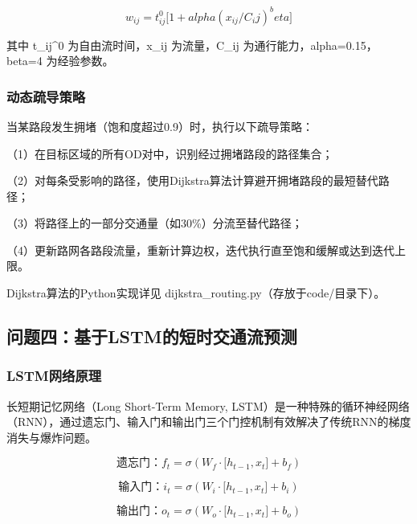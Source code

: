 \begin{equation}
  w_{ij} = t_{ij}^0 \lbrack 1 + alpha(x_{ij}/C_{i}j)^beta\rbrack 
  \label{eq:5}
\end{equation}

其中 t\_ij\textasciicircum{}0 为自由流时间，x\_ij 为流量，C\_ij 为通行能力，alpha=0.15，beta=4 为经验参数。

\subsubsection{动态疏导策略}

当某路段发生拥堵（饱和度超过0.9）时，执行以下疏导策略：

（1）在目标区域的所有OD对中，识别经过拥堵路段的路径集合；

（2）对每条受影响的路径，使用Dijkstra算法计算避开拥堵路段的最短替代路径；

（3）将路径上的一部分交通量（如30\%）分流至替代路径；

（4）更新路网各路段流量，重新计算边权，迭代执行直至饱和缓解或达到迭代上限。

Dijkstra算法的Python实现详见 dijkstra\_routing.py（存放于code/目录下）。

\subsection{问题四：基于LSTM的短时交通流预测}

\subsubsection{LSTM网络原理}

长短期记忆网络（Long Short-Term Memory, LSTM）是一种特殊的循环神经网络（RNN），通过遗忘门、输入门和输出门三个门控机制有效解决了传统RNN的梯度消失与爆炸问题。

\begin{equation}
  \text{遗忘门：}f_{t} = \sigma(W_{f} \cdot  \lbrack h_{t-1}, x_{t}\rbrack  + b_{f})
  \label{eq:6}
\end{equation}

\begin{equation}
  \text{输入门：}i_{t} = \sigma(W_{i} \cdot  \lbrack h_{t-1}, x_{t}\rbrack  + b_{i})
  \label{eq:7}
\end{equation}

\begin{equation}
  \text{输出门：}o_{t} = \sigma(W_{o} \cdot  \lbrack h_{t-1}, x_{t}\rbrack  + b_{o})
  \label{eq:8}
\end{equation}

